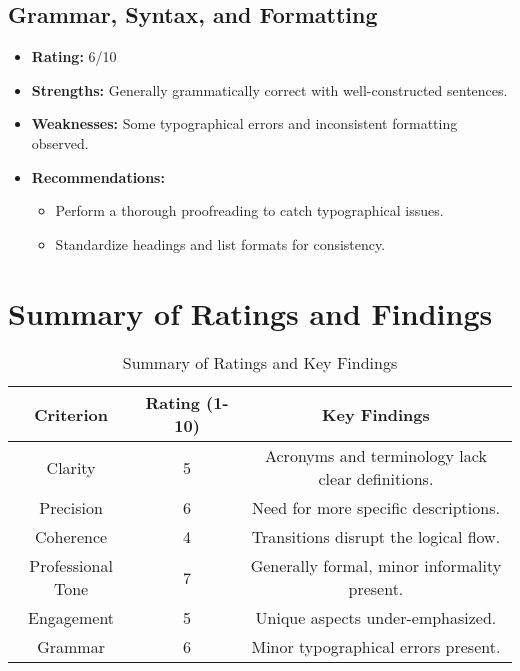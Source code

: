\documentclass[11pt]{article}
\begin{document}
\subsection{Grammar, Syntax, and Formatting}
\begin{itemize}
    \item \textbf{Rating:} 6/10
    \item \textbf{Strengths:} Generally grammatically correct with well-constructed sentences.
    \item \textbf{Weaknesses:} Some typographical errors and inconsistent formatting observed.
    \item \textbf{Recommendations:}
    \begin{itemize}
        \item Perform a thorough proofreading to catch typographical issues.
        \item Standardize headings and list formats for consistency.
    \end{itemize}
\end{itemize}

\section{Summary of Ratings and Findings}
\begin{table}[h]
    \centering
    \begin{tabular}{|c|c|c|}
        \hline
        \textbf{Criterion} & \textbf{Rating (1-10)} & \textbf{Key Findings} \\
        \hline
        Clarity & 5 & Acronyms and terminology lack clear definitions. \\
        \hline
        Precision & 6 & Need for more specific descriptions. \\
        \hline
        Coherence & 4 & Transitions disrupt the logical flow. \\
        \hline
        Professional Tone & 7 & Generally formal, minor informality present. \\
        \hline
        Engagement & 5 & Unique aspects under-emphasized. \\
        \hline
        Grammar & 6 & Minor typographical errors present. \\
        \hline
    \end{tabular}
    \caption{Summary of Ratings and Key Findings}
\end{table}
\end{document}

